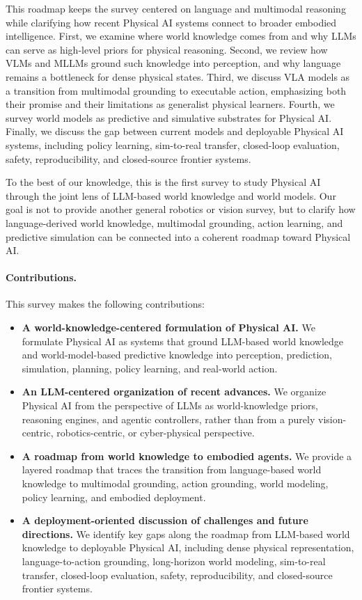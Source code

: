 This roadmap keeps the survey centered on language and multimodal reasoning while clarifying how recent Physical AI systems connect to broader embodied intelligence. 
First, we examine where world knowledge comes from and why LLMs can serve as high-level priors for physical reasoning. 
Second, we review how VLMs and MLLMs ground such knowledge into perception, and why language remains a bottleneck for dense physical states. 
Third, we discuss VLA models as a transition from multimodal grounding to executable action, emphasizing both their promise and their limitations as generalist physical learners. 
Fourth, we survey world models as predictive and simulative substrates for Physical AI. 
Finally, we discuss the gap between current models and deployable Physical AI systems, including policy learning, sim-to-real transfer, closed-loop evaluation, safety, reproducibility, and closed-source frontier systems.

To the best of our knowledge, this is the first survey to study Physical AI through the joint lens of LLM-based world knowledge and world models. 
Our goal is not to provide another general robotics or vision survey, but to clarify how language-derived world knowledge, multimodal grounding, action learning, and predictive simulation can be connected into a coherent roadmap toward Physical AI.

\paragraph{Contributions.}
This survey makes the following contributions:
\begin{itemize}
    \item \textbf{A world-knowledge-centered formulation of Physical AI.}
    We formulate Physical AI as systems that ground LLM-based world knowledge and world-model-based predictive knowledge into perception, prediction, simulation, planning, policy learning, and real-world action.

    \item \textbf{An LLM-centered organization of recent advances.}
    We organize Physical AI from the perspective of LLMs as world-knowledge priors, reasoning engines, and agentic controllers, rather than from a purely vision-centric, robotics-centric, or cyber-physical perspective.

    \item \textbf{A roadmap from world knowledge to embodied agents.}
    We provide a layered roadmap that traces the transition from language-based world knowledge to multimodal grounding, action grounding, world modeling, policy learning, and embodied deployment.

    \item \textbf{A deployment-oriented discussion of challenges and future directions.}
    We identify key gaps along the roadmap from LLM-based world knowledge to deployable Physical AI, including dense physical representation, language-to-action grounding, long-horizon world modeling, sim-to-real transfer, closed-loop evaluation, safety, reproducibility, and closed-source frontier systems.
\end{itemize}

